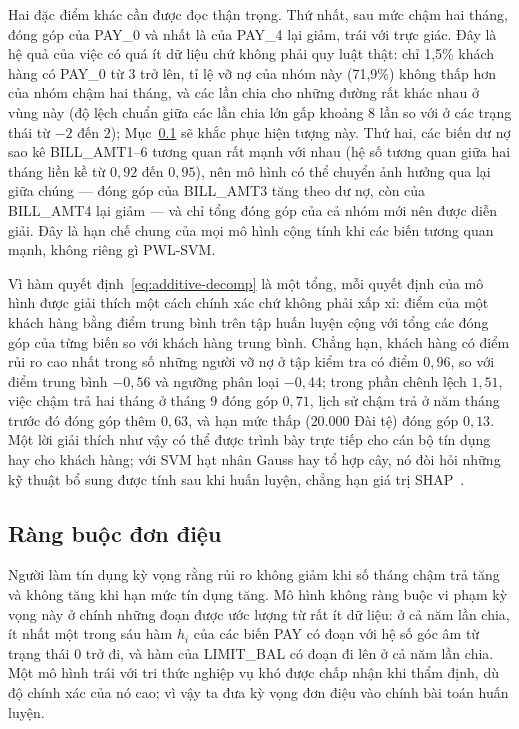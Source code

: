 Hai đặc điểm khác cần được đọc thận trọng. Thứ nhất, sau mức chậm hai tháng, đóng góp của PAY\_0 và nhất là của PAY\_4 lại giảm, trái với trực giác. Đây là hệ quả của việc có quá ít dữ liệu chứ không phải quy luật thật: chỉ 1{,}5\% khách hàng có PAY\_0 từ $3$ trở lên, tỉ lệ vỡ nợ của nhóm này (71{,}9\%) không thấp hơn của nhóm chậm hai tháng, và các lần chia cho những đường rất khác nhau ở vùng này (độ lệch chuẩn giữa các lần chia lớn gấp khoảng 8 lần so với ở các trạng thái từ $-2$ đến $2$); Mục~\ref{sec:monotone} sẽ khắc phục hiện tượng này. Thứ hai, các biến dư nợ sao kê BILL\_AMT1--6 tương quan rất mạnh với nhau (hệ số tương quan giữa hai tháng liền kề từ $0{,}92$ đến $0{,}95$), nên mô hình có thể chuyển ảnh hưởng qua lại giữa chúng --- đóng góp của BILL\_AMT3 tăng theo dư nợ, còn của BILL\_AMT4 lại giảm --- và chỉ tổng đóng góp của cả nhóm mới nên được diễn giải. Đây là hạn chế chung của mọi mô hình cộng tính khi các biến tương quan mạnh, không riêng gì PWL-SVM.

Vì hàm quyết định~\eqref{eq:additive-decomp} là một tổng, mỗi quyết định của mô hình được giải thích một cách chính xác chứ không phải xấp xỉ: điểm của một khách hàng bằng điểm trung bình trên tập huấn luyện cộng với tổng các đóng góp của từng biến so với khách hàng trung bình. Chẳng hạn, khách hàng có điểm rủi ro cao nhất trong số những người vỡ nợ ở tập kiểm tra có điểm $0{,}96$, so với điểm trung bình $-0{,}56$ và ngưỡng phân loại $-0{,}44$; trong phần chênh lệch $1{,}51$, việc chậm trả hai tháng ở tháng 9 đóng góp $0{,}71$, lịch sử chậm trả ở năm tháng trước đó đóng góp thêm $0{,}63$, và hạn mức thấp ($20.000$ Đài tệ) đóng góp $0{,}13$. Một lời giải thích như vậy có thể được trình bày trực tiếp cho cán bộ tín dụng hay cho khách hàng; với SVM hạt nhân Gauss hay tổ hợp cây, nó đòi hỏi những kỹ thuật bổ sung được tính sau khi huấn luyện, chẳng hạn giá trị SHAP~\cite{lundberg2017}.

\subsection{Ràng buộc đơn điệu}\label{sec:monotone}

Người làm tín dụng kỳ vọng rằng rủi ro không giảm khi số tháng chậm trả tăng và không tăng khi hạn mức tín dụng tăng. Mô hình không ràng buộc vi phạm kỳ vọng này ở chính những đoạn được ước lượng từ rất ít dữ liệu: ở cả năm lần chia, ít nhất một trong sáu hàm $h_i$ của các biến PAY có đoạn với hệ số góc âm từ trạng thái $0$ trở đi, và hàm của LIMIT\_BAL có đoạn đi lên ở cả năm lần chia. Một mô hình trái với tri thức nghiệp vụ khó được chấp nhận khi thẩm định, dù độ chính xác của nó cao; vì vậy ta đưa kỳ vọng đơn điệu vào chính bài toán huấn luyện.

